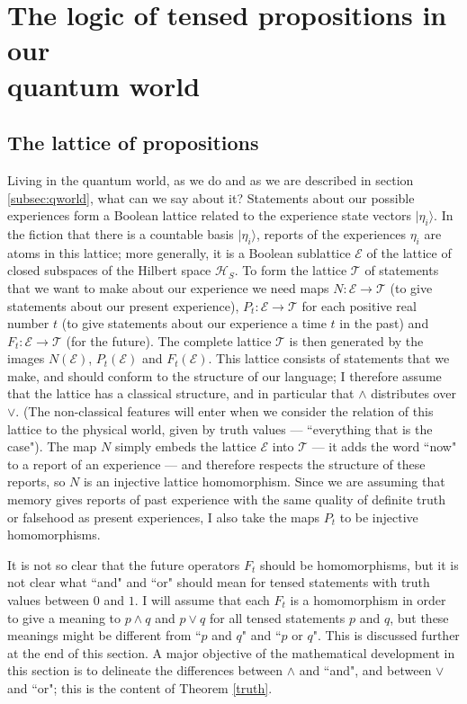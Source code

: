 \documentclass[12pt,a4paper,reqno]{article}
\renewcommand{\(}{\left(}
\renewcommand{\)}{\right)}
\newcommand{\E}{\mathcal{E}}
\renewcommand{\H}{\mathcal{H}}
\newcommand{\T}{\mathcal{T}}
\newcommand{\<}{\langle}
\renewcommand{\>}{\rangle}
\theoremstyle{plain} %
\begin{document}
\section{The logic of tensed propositions in our \\quantum world}
\label{sec:logic}

\subsection{The lattice of propositions}
\label{subsec:lattice}

Living in the quantum world, as we do and as we are described in section \ref{subsec:qworld}, what can we say about it? Statements about our possible experiences form a Boolean lattice related to the experience state vectors $|\eta_i\>$. In the fiction that there is a countable basis $|\eta_i\>$, reports of the experiences $\eta_i$ are atoms in this lattice; more generally, it is a Boolean sublattice $\E$ of the lattice of closed subspaces of the Hilbert space $\H_S$.  To form the lattice $\T$ of statements that we want to make about our experience we need maps $N:\E\to\T$ (to give statements about our present experience), $P_t:\E\to\T$ for each positive real number $t$ (to give statements about our experience a time $t$ in the past) and $F_t:\E\to\T$ (for the future). The complete lattice $\T$ is then generated by the images $N(\E)$, $P_t(\E)$ and $F_t(\E)$. This lattice consists of statements that we make, and should conform to the structure of our language; I therefore assume that the lattice has a classical structure, and in particular that $\land$ distributes over $\lor$. (The non-classical features will enter when we consider the relation of this lattice to the physical world, given by truth values --- ``everything that is the case"). The map $N$ simply embeds the lattice $\E$ into $\T$ --- it adds the word ``now" to a report of an experience --- and therefore respects the structure of these reports, so $N$ is an injective lattice homomorphism. Since we are assuming that memory gives reports of past experience with the same quality of definite truth or falsehood as present experiences, I also take the maps $P_t$ to be injective homomorphisms. 

It is not so clear that the future operators $F_t$ should be homomorphisms, but it is not clear what ``and" and ``or" should mean for tensed statements with truth values between $0$ and $1$. I will assume that each $F_t$ is a homomorphism in order to give a meaning to $p\land q$ and $p\lor q$ for all tensed statements $p$ and $q$, but these meanings might be different from ``$p$ and $q$" and ``$p$ or $q$". This is discussed further at the end of this section. A major objective of the mathematical development in this section is to delineate the differences between $\land$ and ``and", and between $\lor$ and ``or"; this is the content of Theorem \ref{truth}. 
\end{document}
